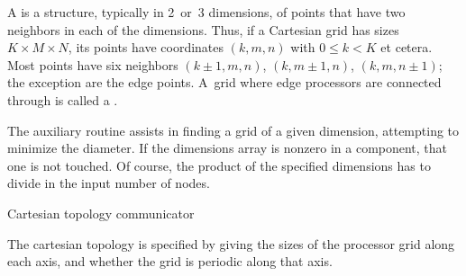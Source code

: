 A  is a structure, typically in 2~or~3 dimensions,
of points that have two neighbors in each of the dimensions.
Thus, if a Cartesian grid has sizes $K\times M\times N$, its
points have coordinates $(k,m,n)$ with $0\leq k<K$ et cetera.
Most points have six neighbors $(k\pm1,m,n)$, $(k,m\pm1,n)$, $(k,m,n\pm1)$;
the exception are the edge points. A~grid where edge processors
are connected through  is called
a .

The auxiliary routine 
assists in finding a grid of a given dimension,
attempting to minimize the diameter.
%
{
  \def\snippetcodefraction{.45}
  \def\snippetlistfraction{.55}
  }
%
If the dimensions array is nonzero in a component, that one is not touched. 
Of course, the product of the specified dimensions has to divide in
the input number of nodes.

\begin{comment}
  \Level 1 {Cartesian coordinates}

  The most common use of Cartesian coordinates
  is to find the rank of process by referring to it in grid terms.
  For instance, one could ask `what are my neighbors offset by $(1,0,0)$, 
  $(-1,0,0)$, $(0,1,0)$ et cetera'.

  While the Cartesian topology interface is fairly easy to use, as
  opposed to the more complicated general graph topology below, it is
  not actually sufficient for all Cartesian graph uses. Notably, in
  a so-called \indextermsub{star}{stencil}, such as the
  \indextermsub{nine-point}{stencil}, there are diagonal connections,
  which can not be described in a single step. Instead, it is necessary
  to take a separate step along each coordinate dimension. In higher
  dimensions this is of course fairly awkward.

  Thus, even for Cartesian structures, it may be advisable to use the
  general graph topology interface.
\end{comment}

 {Cartesian topology communicator}
\label{sec:cart-comm-create}

The cartesian topology is specified by giving
 the sizes of the processor grid along
each axis, and whether the grid is periodic along that axis.


